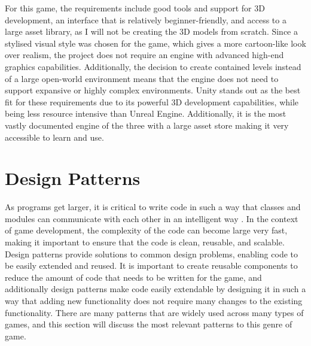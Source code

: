 \documentclass[10pt]{final_report}
\begin{document}
For this game, the requirements include good tools and support for 3D development, an interface that is relatively beginner-friendly, and access to a large asset library, as I will not be creating the 3D models from scratch. Since a stylised visual style was chosen for the game, which gives a more cartoon-like look over realism, the project does not require an engine with advanced high-end graphics capabilities. Additionally, the decision to create contained levels instead of a large open-world environment means that the engine does not need to support expansive or highly complex environments.
Unity stands out as the best fit for these requirements due to its powerful 3D development capabilities, while being less resource intensive than Unreal Engine. Additionally, it is the most vastly documented engine of the three with a large asset store making it very accessible to learn and use.


\section{Design Patterns}
As programs get larger, it is critical to write code in such a way that classes and modules can communicate with each other in an intelligent way \cite{Doran2017}. In the context of game development, the complexity of the code can become large very fast, making it important to ensure that the code is clean, reusable, and scalable. Design patterns provide solutions to common design problems, enabling code to be easily extended and reused. It is important to create reusable components to reduce the amount of code that needs to be written for the game, and additionally design patterns make code easily extendable by designing it in such a way that adding new functionality does not require many changes to the existing functionality. There are many patterns that are widely used across many types of games, and this section will discuss the most relevant patterns to this genre of game.
\end{document}
